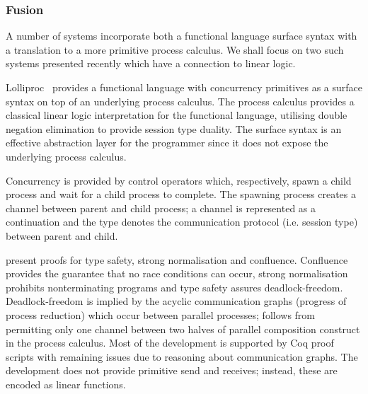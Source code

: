\documentclass{mprop}
\begin{document}
\subsubsection{Fusion}

A number of systems incorporate both a functional language surface syntax with
a translation to a more primitive process calculus. We shall focus on two such
systems presented recently which have a connection to linear logic.

Lolliproc~\cite{Mazurak:2010:LCC} provides a functional language with
concurrency primitives as a surface syntax on top of an underlying process
calculus. The process calculus provides a classical linear logic
interpretation for the functional language, utilising double negation
elimination to provide session type duality. The surface syntax is an
effective abstraction layer for the programmer since it does not expose the
underlying process calculus.

Concurrency is provided by control operators which, respectively, spawn a
child process and wait for a child process to complete. The spawning process
creates a channel between parent and child process; a channel is represented
as a continuation and the type denotes the communication protocol
(i.e. session type) between parent and child.

\citeauthor{Mazurak:2010:LCC} present proofs for type safety, strong
normalisation and confluence. Confluence provides the guarantee that no race
conditions can occur, strong normalisation prohibits nonterminating programs
and type safety assures deadlock-freedom. Deadlock-freedom is implied by the
acyclic communication graphs (progress of process reduction) which occur
between parallel processes; follows from permitting only one channel between
two halves of parallel composition construct in the process calculus. Most of
the development is supported by Coq proof scripts with remaining issues due to
reasoning about communication graphs. The development does not provide
primitive send and receives; instead, these are encoded as linear functions.
\end{document}
